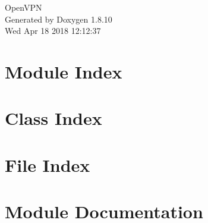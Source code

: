\documentclass[twoside]{book}
\newcommand{\+}{\discretionary{\mbox{\scriptsize$\hookleftarrow$}}{}{}}
\newcommand{\clearemptydoublepage}{%
  \newpage{\pagestyle{empty}\cleardoublepage}%
}
\begin{document}
\hypersetup{pageanchor=false,
             bookmarks=true,
             bookmarksnumbered=true,
             pdfencoding=unicode
            }
\begin{titlepage}
\vspace*{7cm}
\begin{center}%
{\Large Open\+V\+P\+N }\\
\vspace*{1cm}
{\large Generated by Doxygen 1.8.10}\\
\vspace*{0.5cm}
{\small Wed Apr 18 2018 12:12:37}\\
\end{center}
\end{titlepage}
\clearemptydoublepage
\tableofcontents
\clearemptydoublepage
{}
\hypersetup{pageanchor=true}

\chapter{Module Index}

\chapter{Class Index}

\chapter{File Index}

\chapter{Module Documentation}





\end{document}
